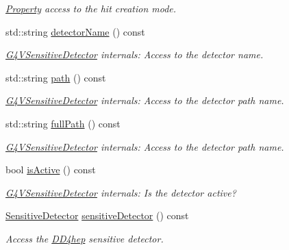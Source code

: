 \begin{DoxyCompactItemize}
\begin{DoxyCompactList}\small\item\em \hyperlink{class_d_d4hep_1_1_property}{Property} access to the hit creation mode. \item\end{DoxyCompactList}\item 
std::string \hyperlink{class_d_d4hep_1_1_simulation_1_1_geant4_sensitive_aebef8cd9fe54668ef5d19c481aef1452}{detectorName} () const 
\begin{DoxyCompactList}\small\item\em \hyperlink{class_g4_v_sensitive_detector}{G4VSensitiveDetector} internals: Access to the detector name. \item\end{DoxyCompactList}\item 
std::string \hyperlink{class_d_d4hep_1_1_simulation_1_1_geant4_sensitive_af0dd51ffd093c81452258d43f064fe49}{path} () const 
\begin{DoxyCompactList}\small\item\em \hyperlink{class_g4_v_sensitive_detector}{G4VSensitiveDetector} internals: Access to the detector path name. \item\end{DoxyCompactList}\item 
std::string \hyperlink{class_d_d4hep_1_1_simulation_1_1_geant4_sensitive_a86cc8105ff6b9f80e3a4dfce385d3cd8}{fullPath} () const 
\begin{DoxyCompactList}\small\item\em \hyperlink{class_g4_v_sensitive_detector}{G4VSensitiveDetector} internals: Access to the detector path name. \item\end{DoxyCompactList}\item 
bool \hyperlink{class_d_d4hep_1_1_simulation_1_1_geant4_sensitive_a4440fac2d42489c6df33f3b8f416f512}{isActive} () const 
\begin{DoxyCompactList}\small\item\em \hyperlink{class_g4_v_sensitive_detector}{G4VSensitiveDetector} internals: Is the detector active? \item\end{DoxyCompactList}\item 
\hyperlink{class_d_d4hep_1_1_geometry_1_1_sensitive_detector}{SensitiveDetector} \hyperlink{class_d_d4hep_1_1_simulation_1_1_geant4_sensitive_a116a18b8967f8606b94779ece95d615d}{sensitiveDetector} () const 
\begin{DoxyCompactList}\small\item\em Access the \hyperlink{namespace_d_d4hep}{DD4hep} sensitive detector. \item\end{DoxyCompactList}\item 

\end{DoxyCompactItemize}
